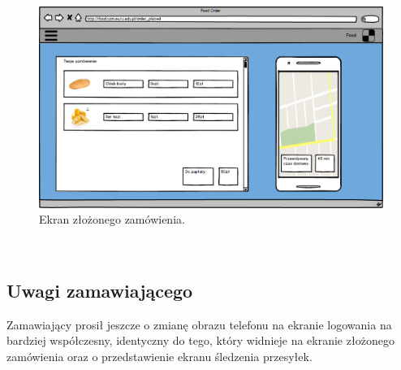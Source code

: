 \begin{figure}[H]
\centering
\includegraphics[width=15cm]{pictures/Zamowienie_zlozone_v3.png}
\caption{Ekran złożonego zamówienia.}
\end{figure}

\subsection{Uwagi zamawiającego}
Zamawiający prosił jeszcze o zmianę obrazu telefonu na ekranie logowania na bardziej współczesny, identyczny do tego, który widnieje na ekranie złożonego zamówienia oraz o przedstawienie ekranu śledzenia przesyłek.

